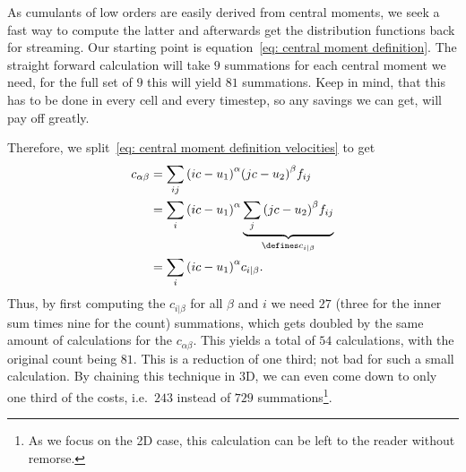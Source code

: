 
As cumulants of low orders are easily derived from central moments, we seek a fast way to compute the latter and afterwards get the distribution functions back for streaming.
Our starting point is equation~\eqref{eq: central moment definition}.
The straight forward calculation will take $9$ summations for each central moment we need, for the full set of $9$ this will yield $81$ summations.
Keep in mind, that this has to be done in every cell and every timestep, so any savings we can get, will pay off greatly.

Therefore, we split~\eqref{eq: central moment definition velocities} to get
\begin{equation*}
  \begin{aligned}
    c_{\alpha\beta}
    & = \sum_{ij} {\left(ic-u_1\right)}^\alpha {\left(jc-u_2\right)}^\beta f_{ij} \\
    & = \sum_{i} {\left(ic-u_1\right)}^\alpha \underbrace{\sum_{j} {\left(jc-u_2\right)}^\beta f_{ij}}_{\defines c_{i|\beta}} \\
    & = \sum_{i} {\left(ic-u_1\right)}^\alpha c_{i|\beta}.
  \end{aligned}
\end{equation*}
Thus, by first computing the $c_{i|\beta}$ for all $\beta$ and $i$ we need $27$ (three for the inner sum times nine for the count) summations, which gets doubled by the same amount of calculations for the $c_{\alpha\beta}$.
This yields a total of $54$ calculations, with the original count being $81$.
This is a reduction of one third; not bad for such a small calculation.
By chaining this technique in 3D, we can even come down to only one third of the costs, i.e.\ $243$ instead of $729$ summations\footnote{As we focus on the 2D case, this calculation can be left to the reader without remorse.}.


